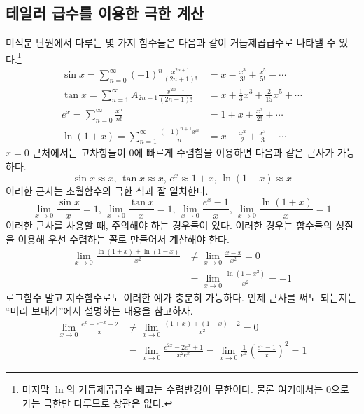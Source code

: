 \documentclass{scrartcl}
\newcommand{\infsum}[1]{\sum^\infty_{#1}}
\begin{document}
\subsection{테일러 급수를 이용한 극한 계산}
미적분 단원에서 다루는 몇 가지 함수들은 다음과 같이 거듭제곱급수로 나타낼 수 있다.\footnote{마지막 \(\ln\)의 거듭제곱급수 빼고는 수렴반경이 무한이다. 물론 여기에서는 0으로 가는 극한만 다루므로 상관은 없다.}
\begin{align*}
\sin x=\infsum{n = 0}(-1)^n\frac{x^{2n+1}}{(2n+1)!}&=x-\frac{x^3}{3!}+\frac{x^5}{5!}-\cdots \\
\tan x=\infsum{n = 1}A_{2n-1}\frac{x^{2n-1}}{(2n-1)!}&=x+\frac{1}{3}x^3+\frac{2}{15}x^5+\cdots \\
e^x=\infsum{n=0}\frac{x^n}{n!}&=1+x+\frac{x^2}{2!}+\cdots \\
\ln (1+x)=\infsum{n=1}\frac{(-1)^{n+1}x^n}{n}&=x-\frac{x^2}{2}+\frac{x^3}{3}-\cdots
\end{align*}
\(x=0\) 근처에서는 고차항들이 0에 빠르게 수렴함을 이용하면 다음과 같은 근사가 가능하다.
\[
\sin x\approx x,\,\tan x\approx x,\,e^x\approx 1+x,\,\ln(1+x)\approx x
\]
이러한 근사는 초월함수의 극한 식과 잘 일치한다.
\[
\lim_{x\to0}\frac{\sin x}{x}=1,\,\lim_{x\to0}\frac{\tan x}{x}=1,\,\lim_{x\to0}\frac{e^x-1}{x},\,\lim_{x\to0}\frac{\ln(1+x)}{x}=1
\]
이러한 근사를 사용할 때, 주의해야 하는 경우들이 있다. 이러한 경우는 함수들의 성질을 이용해 우선 수렴하는 꼴로 만들어서 계산해야 한다.
\begin{align*}
\lim_{x\to0}\frac{\ln(1+x)+\ln(1-x)}{x^2}&\neq\lim_{x\to0}\frac{x - x}{x^2}=0 \tag{틀린 풀이} \\
&=\lim_{x\to0}\frac{\ln(1-x^2)}{x^2}=-1 \tag{맞는 풀이}
\end{align*}
로그함수 말고 지수함수로도 이러한 예가 충분히 가능하다. 언제 근사를 써도 되는지는 ``미리 보내기''에서 설명하는 내용을 참고하자.
\begin{align*}
\lim_{x\to0}\frac{e^x+e^{-x}-2}{x}&\neq\lim_{x\to0}\frac{(1+x)+(1-x)-2}{x^2}=0 \tag{틀린 풀이} \\
&=\lim_{x\to0}\frac{e^{2x}-2e^x+1}{x^2e^x}=\lim_{x\to0}\frac{1}{e^x}\left(\frac{e^x-1}{x}\right)^2=1 \tag{맞는 풀이}
\end{align*}
\end{document}
